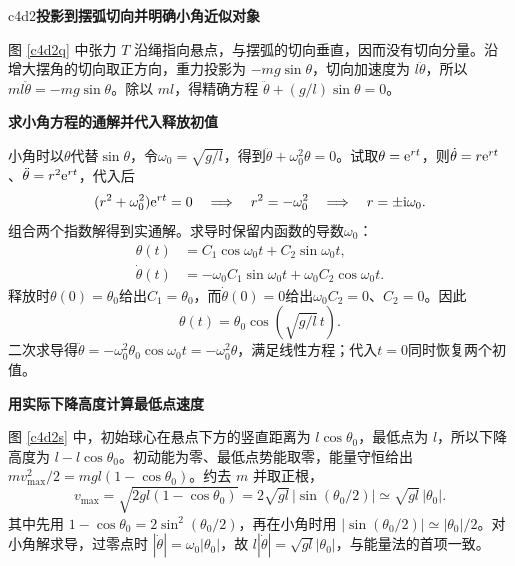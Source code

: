 \begin{drillsolution}{c4d2}\textbf{投影到摆弧切向并明确小角近似对象}\par\nobreak
图 \ref{c4d2q} 中张力 $T$ 沿绳指向悬点，与摆弧的切向垂直，因而没有切向分量。沿增大摆角的切向取正方向，重力投影为 $-mg\sin\theta$，切向加速度为 $l\ddot\theta$，所以 $ml\ddot\theta=-mg\sin\theta$。除以 $ml$，得精确方程 $\ddot\theta+(g/l)\sin\theta=0$。

\par\medskip{}\noindent\textbf{求小角方程的通解并代入释放初值}\par\nobreak
小角时以$\theta$代替$\sin\theta$，令$\omega_0=\sqrt{g/l}$，得到$\ddot\theta+\omega_0^2\theta=0$。试取$\theta=\mathrm e^{rt}$，则$\dot\theta=r\mathrm e^{rt}$、$\ddot\theta=r^2\mathrm e^{rt}$，代入后
\[
(r^2+\omega_0^2)\mathrm e^{rt}=0
\quad\Longrightarrow\quad r^2=-\omega_0^2
\quad\Longrightarrow\quad r=\pm\mathrm i\omega_0.
\]
组合两个指数解得到实通解。求导时保留内函数的导数$\omega_0$：
\begin{align*}
\theta(t)&=C_1\cos\omega_0t+C_2\sin\omega_0t,\\
\dot\theta(t)&=-\omega_0C_1\sin\omega_0t
                 +\omega_0C_2\cos\omega_0t.
\end{align*}
释放时$\theta(0)=\theta_0$给出$C_1=\theta_0$，而$\dot\theta(0)=0$给出$\omega_0C_2=0$、$C_2=0$。因此
\[
\theta(t)=\theta_0\cos\left(\sqrt{g/l}\,t\right).
\]
二次求导得$\ddot\theta=-\omega_0^2\theta_0\cos\omega_0t=-\omega_0^2\theta$，满足线性方程；代入$t=0$同时恢复两个初值。



\par\medskip{}\noindent\textbf{用实际下降高度计算最低点速度}\par\nobreak
图 \ref{c4d2s} 中，初始球心在悬点下方的竖直距离为 $l\cos\theta_0$，最低点为 $l$，所以下降高度为 $l-l\cos\theta_0$。初动能为零、最低点势能取零，能量守恒给出
$mv_{\max}^2/2=mgl(1-\cos\theta_0)$。约去 $m$ 并取正根，
\[
 v_{\max}=\sqrt{2gl(1-\cos\theta_0)}
 =2\sqrt{gl}\,|\sin(\theta_0/2)|
 \simeq\sqrt{gl}\,|\theta_0|.
\]
其中先用 $1-\cos\theta_0=2\sin^2(\theta_0/2)$，再在小角时用 $|\sin(\theta_0/2)|\simeq|\theta_0|/2$。对小角解求导，过零点时 $|\dot\theta|=\omega_0|\theta_0|$，故 $l|\dot\theta|=\sqrt{gl}|\theta_0|$，与能量法的首项一致。
\end{drillsolution}
